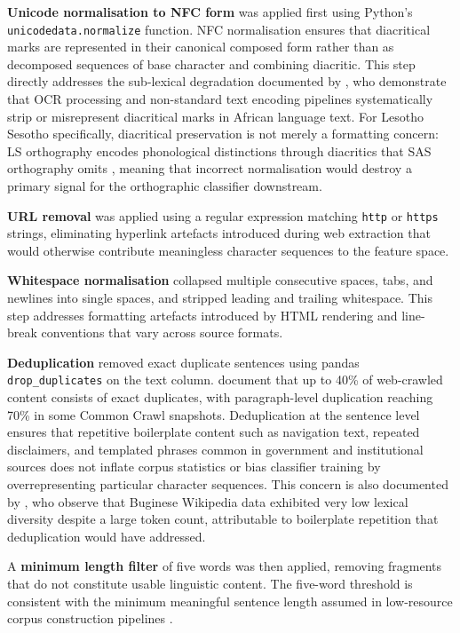 \documentclass[11pt,a4paper]{article}
\begin{document}
\textbf{Unicode normalisation to NFC form} was applied first using
Python's \texttt{unicodedata.normalize} function. NFC normalisation
ensures that diacritical marks are represented in their canonical
composed form rather than as decomposed sequences of base character
and combining diacritic. This step directly addresses the sub-lexical
degradation documented by \citet{de2007automatic}, who
demonstrate that OCR processing and non-standard text encoding
pipelines systematically strip or misrepresent diacritical marks in
African language text. For Lesotho Sesotho specifically, diacritical
preservation is not merely a formatting concern: LS orthography
encodes phonological distinctions through diacritics that SAS
orthography omits \citep{matlosa2017sesotho}, meaning that incorrect
normalisation would destroy a primary signal for the orthographic
classifier downstream.

\textbf{URL removal} was applied using a regular expression matching
\texttt{http} or \texttt{https} strings, eliminating hyperlink
artefacts introduced during web extraction that would otherwise
contribute meaningless character sequences to the feature space.

\textbf{Whitespace normalisation} collapsed multiple consecutive
spaces, tabs, and newlines into single spaces, and stripped leading
and trailing whitespace. This step addresses formatting artefacts
introduced by HTML rendering and line-break
conventions that vary across source formats.

\textbf{Deduplication} removed exact duplicate sentences using
pandas \texttt{drop\_duplicates} on the text column.
\citet{tatariya2024good} document that up to 40\% of
web-crawled content consists of exact duplicates, with
paragraph-level duplication reaching 70\% in some Common Crawl
snapshots. Deduplication at the sentence level ensures that
repetitive boilerplate content such as navigation text, repeated
disclaimers, and templated phrases common in government and
institutional sources does not inflate corpus statistics or
bias classifier training by overrepresenting particular character
sequences. This concern is also documented by
\citet{cahyawijaya2023nusawrites}, who observe that Buginese
Wikipedia data exhibited very low lexical diversity despite a large
token count, attributable to boilerplate repetition that deduplication
would have addressed.

A \textbf{minimum length filter} of five words was then applied,
removing fragments that do not constitute usable linguistic content.
The five-word threshold is consistent with the minimum meaningful
sentence length assumed in low-resource corpus construction
pipelines \citep{de2024data}.
\end{document}

